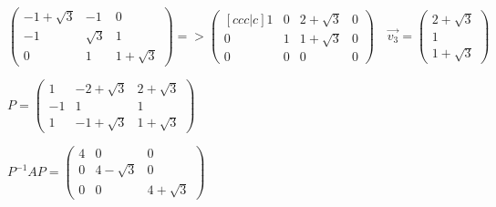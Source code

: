 \documentclass[12pt,letterpaper]{article}
\begin{document}
\begin{enumerate}[label=(\alph*)]
        $\begin{pmatrix} -1 + \sqrt{3} & -1 & 0 \\ -1 & \sqrt{3} & 1 \\ 0 & 1 & 1 + \sqrt{3} \end{pmatrix} => \begin{pmatrix}[ccc|c] 1 & 0 & 2 + \sqrt{3} & 0 \\ 0 & 1 & 1 + \sqrt{3} & 0 \\ 0 & 0 & 0 & 0 \end{pmatrix} \quad \vec{v_3} = \begin{pmatrix} 2 + \sqrt{3} \\ 1 \\ 1 + \sqrt{3} \end{pmatrix}$
        
        $P = \begin{pmatrix} 
            1 & -2 + \sqrt{3} & 2 + \sqrt{3} \\ 
            -1 & 1 & 1 \\
            1 & -1 + \sqrt{3} & 1 + \sqrt{3}
        \end{pmatrix}$
        
        $P^{-1}AP = \begin{pmatrix} 
            4 & 0 & 0 \\ 
            0 & 4 - \sqrt{3} & 0 \\
            0 & 0 & 4 + \sqrt{3}
        \end{pmatrix}$
        
    \end{enumerate}
    
\end{document}
